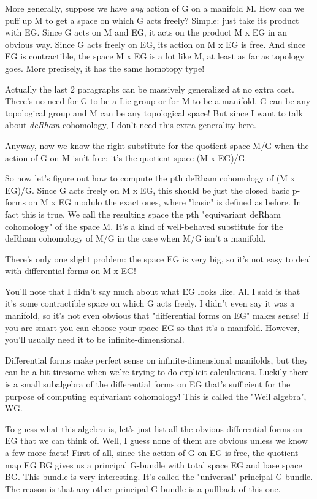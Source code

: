 More generally, suppose we have \emph{any} action of G on a manifold M.  How
can we puff up M to get a space on which G acts freely?  Simple: just
take its product with EG.  Since G acts on M and EG, it acts on the
product M x EG in an obvious way.  Since G acts freely on EG, its action
on M x EG is free.  And since EG is contractible, the space M x EG is a
lot like M, at least as far as topology goes.  More precisely, it has
the same homotopy type!    

Actually the last 2 paragraphs can be massively generalized at no extra
cost.  There's no need for G to be a Lie group or for M to be a manifold.  
G can be any topological group and M can be any topological space!  But
since I want to talk about \emph{deRham} cohomology, I don't need this extra
generality here.

Anyway, now we know the right substitute for the quotient space M/G when 
the action of G on M isn't free: it's the quotient space (M x EG)/G.


So now let's figure out how to compute the pth deRham cohomology of (M x
EG)/G.  Since G acts freely on M x EG, this should be just the closed
basic p-forms on M x EG modulo the exact ones, where "basic"
is defined as before.  In fact this is true.  We call the resulting
space the pth "equivariant deRham cohomology" of the space M.
It's a kind of well-behaved substitute for the deRham cohomology of M/G in the 
case when M/G isn't a manifold. 

There's only one slight problem: the space EG is very big, so it's not
easy to deal with differential forms on M x EG!  

You'll note that I didn't say much about what EG looks like.  All I said
is that it's some contractible space on which G acts freely.   I didn't
even say it was a manifold, so it's not even obvious that "differential
forms on EG" makes sense!  If you are smart you can choose your space EG
so that it's a manifold.  However, you'll usually need it to be 
infinite-dimensional.

Differential forms make perfect sense on infinite-dimensional
manifolds, but they can be a bit tiresome when we're trying to do
explicit calculations.  Luckily there is a small subalgebra of the
differential forms on EG that's sufficient for the purpose of computing
equivariant cohomology!  This is called the "Weil algebra", WG.  

To guess what this algebra is, let's just list all the obvious
differential forms on EG that we can think of.  Well, I guess none of
them are obvious unless we know a few more facts!  First of all, since
the action of G on EG is free, the quotient map EG \to  BG gives us a
principal G-bundle with total space EG and base space BG.  This bundle
is very interesting.  It's called the "universal" principal 
G-bundle.  The reason is that any other principal G-bundle is a pullback 
of this one.  

